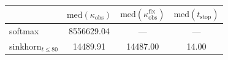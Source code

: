 \begin{tabular}{lccc}
\toprule
 & $\mathrm{med}(\kappa_{\mathrm{obs}})$ & $\mathrm{med}(\kappa_{\mathrm{obs}}^{\mathrm{fix}})$ & $\mathrm{med}(t_{\mathrm{stop}})$ \\
\midrule
softmax & 8556629.04 & --- & --- \\
sinkhorn$_{t\le 80}$ & 14489.91 & 14487.00 & 14.00 \\
\bottomrule
\end{tabular}
